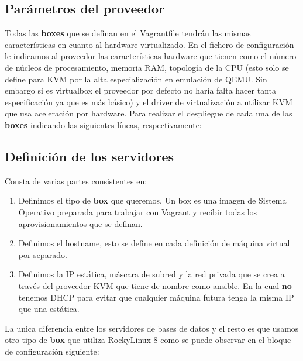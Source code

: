 

\subsection{Parámetros del proveedor}

Todas las \textbf{boxes} que se definan en el Vagrantfile tendrán las mismas características en cuanto al hardware virtualizado. En el fichero de configuración le indicamos al proveedor las características hardware que tienen como el número de núcleos de procesamiento, memoria RAM, topología de la CPU (esto solo se define para KVM por la alta especialización en emulación de QEMU. Sin embargo si es virtualbox el proveedor por defecto no haría falta hacer tanta especificación ya que es más básico) y el driver de virtualización a utilizar KVM que usa aceleración por hardware. Para realizar el despliegue de cada una de las \textbf{boxes} indicando las siguientes líneas, respectivamente:



\subsection{Definición de los servidores}

Consta de varias partes consistentes en:
\begin{enumerate}
    \item Definimos el tipo de \textbf{box} que queremos. Un box es una imagen de Sistema Operativo preparada para trabajar con Vagrant y recibir todas los aprovisionamientos que se definan.
    \item Definimos el hostname, esto se define en cada definición de máquina virtual por separado.
    \item Definimos la IP estática, máscara de subred y la red privada que se crea a través del proveedor KVM que tiene de nombre como ansible. En la cual \textbf{no} tenemos DHCP para evitar que cualquier máquina futura tenga la misma IP que una estática.
\end{enumerate}

La unica diferencia entre los servidores de bases de datos y el resto es que usamos otro tipo de \textbf{box} que utiliza RockyLinux 8 como se puede observar en el bloque de configuración siguiente:
\vspace{5mm}

